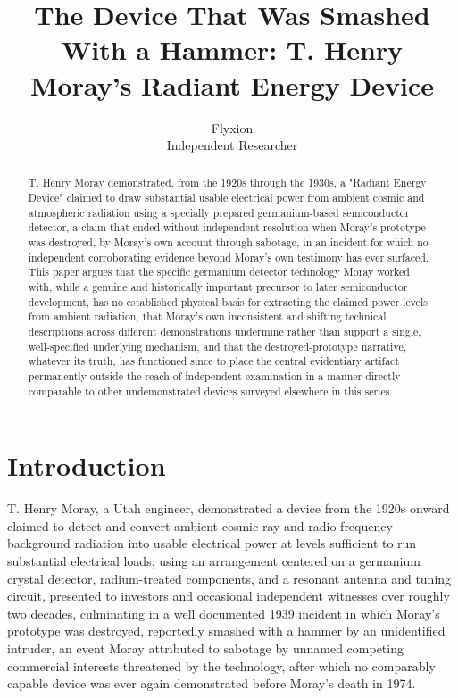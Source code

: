 \documentclass[11pt]{article}
\title{The Device That Was Smashed With a Hammer: T. Henry Moray's Radiant Energy Device}
\author{Flyxion \\ \small Independent Researcher}
\date{}
\begin{document}
\maketitle

\begin{abstract}
T. Henry Moray demonstrated, from the 1920s through the 1930s, a "Radiant Energy Device" claimed to draw substantial usable electrical power from ambient cosmic and atmospheric radiation using a specially prepared germanium-based semiconductor detector, a claim that ended without independent resolution when Moray's prototype was destroyed, by Moray's own account through sabotage, in an incident for which no independent corroborating evidence beyond Moray's own testimony has ever surfaced. This paper argues that the specific germanium detector technology Moray worked with, while a genuine and historically important precursor to later semiconductor development, has no established physical basis for extracting the claimed power levels from ambient radiation, that Moray's own inconsistent and shifting technical descriptions across different demonstrations undermine rather than support a single, well-specified underlying mechanism, and that the destroyed-prototype narrative, whatever its truth, has functioned since to place the central evidentiary artifact permanently outside the reach of independent examination in a manner directly comparable to other undemonstrated devices surveyed elsewhere in this series.
\end{abstract}

\section{Introduction}

T. Henry Moray, a Utah engineer, demonstrated a device from the 1920s onward claimed to detect and convert ambient cosmic ray and radio frequency background radiation into usable electrical power at levels sufficient to run substantial electrical loads, using an arrangement centered on a germanium crystal detector, radium-treated components, and a resonant antenna and tuning circuit, presented to investors and occasional independent witnesses over roughly two decades, culminating in a well documented 1939 incident in which Moray's prototype was destroyed, reportedly smashed with a hammer by an unidentified intruder, an event Moray attributed to sabotage by unnamed competing commercial interests threatened by the technology, after which no comparably capable device was ever again demonstrated before Moray's death in 1974.
\end{document}
